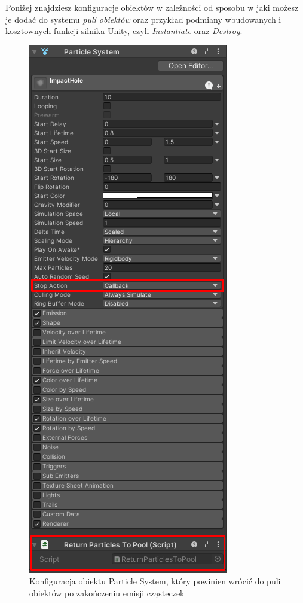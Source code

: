 Poniżej znajdziesz konfiguracje obiektów w zależności od sposobu w jaki możesz je dodać do systemu \textit{puli obiektów} oraz przykład podmiany wbudowanych i kosztownych funkcji silnika Unity, czyli \textit{Instantiate} oraz \textit{Destroy}.
\begin{figure}[h]
    \centering
    \includegraphics[scale=0.55]{Images/particlesObjPoolSetup.png}
    \caption{Konfiguracja obiektu Particle System, który powinien wrócić do puli obiektów po zakończeniu emisji cząsteczek}
\end{figure}
